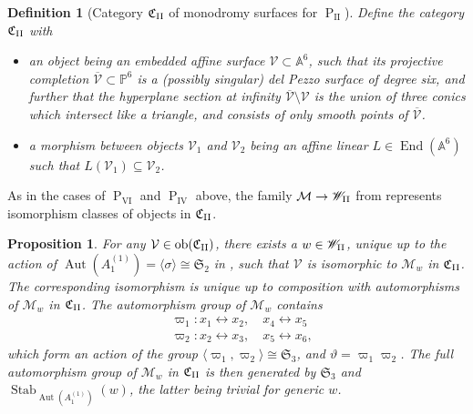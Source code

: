 \documentclass[a4paper,reqno]{amsart}
\numberwithin{equation}{section}
\newcommand{\p}{\mathbb{P}}
\newcommand{\pain}[1]{\operatorname{P}_{\mathrm{#1}}}
\DeclareMathOperator{\Aut}{Aut}
\newtheorem{definition}[theorem]{Definition}
\newtheorem{proposition}[theorem]{Proposition}
\numberwithin{equation}{section}
\begin{document}
\begin{definition}[Category $\mathfrak{C}_{\rm{II}}$ of monodromy surfaces for $\pain{II}$]
Define the category $\mathfrak{C}_{\rm{II}}$ with 
\begin{itemize}
    \item an object being an embedded affine surface $\mathcal{V}\subset \mathbb{A}^6$, such that its projective completion $\overline{\mathcal{V}}\subset \p^6$ is a (possibly singular) del Pezzo surface of degree six, and further that the hyperplane section at infinity $\overline{\mathcal{V}}\setminus \mathcal{V}$ is the union of three conics which intersect like a triangle, and consists of only smooth points of $\overline{\mathcal{V}}$.
    \item a morphism between objects $\mathcal{V}_1$ and $\mathcal{V}_2$ being an affine linear $L\in\operatorname{End}(\mathbb{A}^6)$ such that $L(\mathcal{V}_1)\subseteq\mathcal{V}_2$.
\end{itemize}
\end{definition}
As in the cases of $\pain{VI}$ and $\pain{IV}$ above, the family $\mathcal{M}\to \mathscr{W}_{\rm{II}}$ from  represents isomorphism classes of objects in $\mathfrak{C}_{\rm{II}}$.

\begin{proposition} \label{prop:oblomkovstylenormalformPII}
    For any $\mathcal{V}\in \operatorname{ob}(\mathfrak{C}_{\rm II})$, there exists a $w\in \mathscr{W}_{\rm{II}}$, unique up to the action of $\operatorname{Aut}(A_1^{(1)})=\langle\sigma\rangle\cong\mathfrak{S}_2$ in , such that $\mathcal{V}$ is isomorphic to $\mathcal{M}_w$ in $\mathfrak{C}_{\rm II}$.  
    The corresponding isomorphism is unique up to composition with automorphisms of $\mathcal{M}_w$ in $\mathfrak{C}_{\rm{II}}$. The automorphism group of $\mathcal{M}_w$ contains
    \begin{equation*}
    \begin{aligned}
    &\varpi_{1} : x_1\leftrightarrow x_2, \quad x_4 \leftrightarrow x_5 \\
    &\varpi_2 : x_2 \leftrightarrow x_3, \quad x_5 \leftrightarrow x_6,
    \end{aligned}
    \end{equation*}
    which form an action of the group $\langle \varpi_1,\varpi_2\rangle\cong\mathfrak{S}_3$, 
    and $\vartheta = \varpi_1\varpi_2$.
    The full automorphism group of $\mathcal{M}_w$ in $\mathfrak{C}_{\rm{II}}$ is then generated by $\mathfrak{S}_3$ and $\operatorname{Stab}_{\Aut(A_1^{(1)})}\left(w\right)$, the latter being trivial for generic $w$.

\end{proposition}
\end{document}
